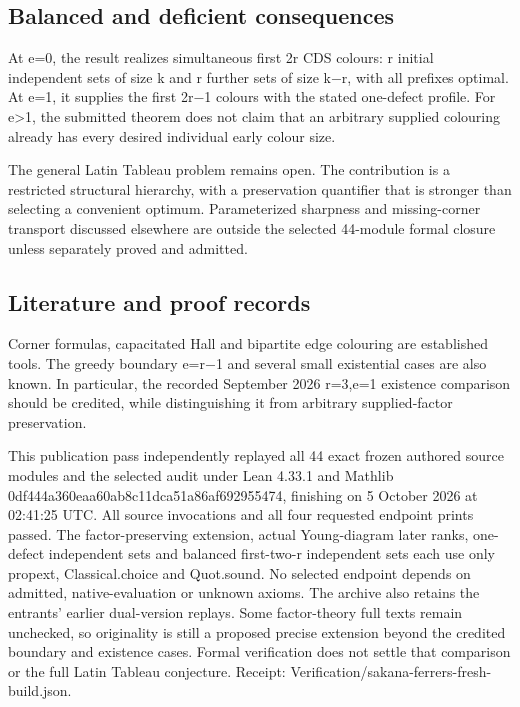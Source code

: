 \documentclass[11pt,a4paper]{article}
\begin{document}
\subsection{Balanced and deficient consequences}
At e=0, the result realizes simultaneous first 2r CDS colours: r initial independent sets of size k and r further sets of size k\ensuremath{-}r, with all prefixes optimal. At e=1, it supplies the first 2r\ensuremath{-}1 colours with the stated one-defect profile. For e>1, the submitted theorem does not claim that an arbitrary supplied colouring already has every desired individual early colour size.

The general Latin Tableau problem remains open. The contribution is a restricted structural hierarchy, with a preservation quantifier that is stronger than selecting a convenient optimum. Parameterized sharpness and missing-corner transport discussed elsewhere are outside the selected 44-module formal closure unless separately proved and admitted.

\subsection{Literature and proof records}
Corner formulas, capacitated Hall and bipartite edge colouring are established tools. The greedy boundary e=r\ensuremath{-}1 and several small existential cases are also known. In particular, the recorded September 2026 r=3,e=1 existence comparison should be credited, while distinguishing it from arbitrary supplied-factor preservation.

This publication pass independently replayed all 44 exact frozen authored source modules and the selected audit under Lean 4.33.1 and Mathlib 0df444a360eaa60ab8c11dca51a86af692955474, finishing on 5 October 2026 at 02:41:25 UTC. All source invocations and all four requested endpoint prints passed. The factor-preserving extension, actual Young-diagram later ranks, one-defect independent sets and balanced first-two-r independent sets each use only propext, Classical.choice and Quot.sound. No selected endpoint depends on admitted, native-evaluation or unknown axioms. The archive also retains the entrants' earlier dual-version replays. Some factor-theory full texts remain unchecked, so originality is still a proposed precise extension beyond the credited boundary and existence cases. Formal verification does not settle that comparison or the full Latin Tableau conjecture. Receipt: Verification/sakana-ferrers-fresh-build.json.
\end{document}
